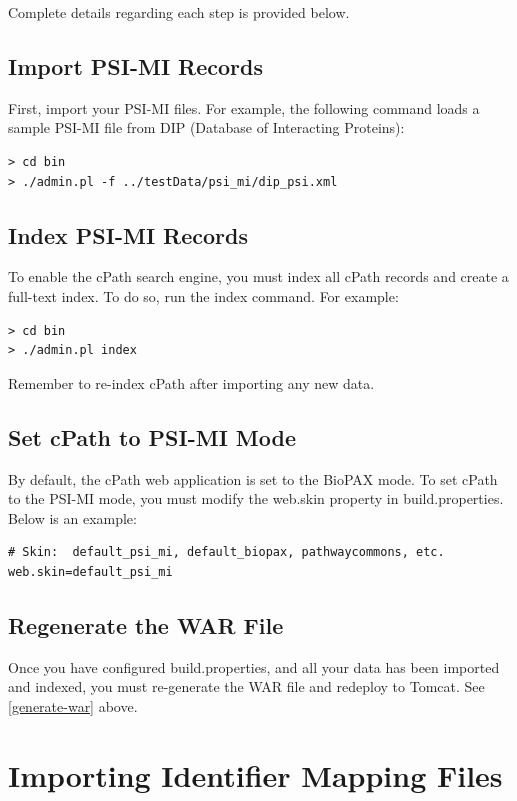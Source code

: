 \documentclass[letterpaper,12pt]{article}
\begin{document}
Complete details regarding each step is provided below.

\subsection{Import PSI-MI Records}

First, import your PSI-MI files.  For example, the following command loads a sample PSI-MI file from DIP (Database of Interacting Proteins):

\begin{verbatim}
> cd bin
> ./admin.pl -f ../testData/psi_mi/dip_psi.xml
\end{verbatim}

\subsection{Index PSI-MI Records}

To enable the cPath search engine, you must index all cPath records and create a full-text index.  To do so, run the index command.  For example:

\begin{verbatim}
> cd bin
> ./admin.pl index
\end{verbatim}

Remember to re-index cPath after importing any new data.

\subsection{Set cPath to PSI-MI Mode}

By default, the cPath web application is set to the BioPAX mode.  To set cPath to the PSI-MI mode, you must modify the web.skin property in build.properties.  Below is an example:

\begin{verbatim}
# Skin:  default_psi_mi, default_biopax, pathwaycommons, etc.
web.skin=default_psi_mi
\end{verbatim} 

\subsection{Regenerate the WAR File}

Once you have configured build.properties, and all your data has been imported and indexed, you must re-generate the WAR file and redeploy to Tomcat.  See \ref{generate-war} above.

\section{Importing Identifier Mapping Files}
\end{document}
